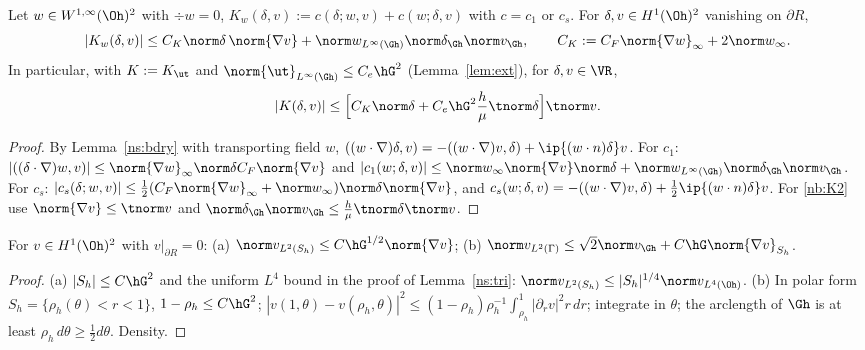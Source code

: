 \begin{lemma}\label{nb:K}
Let $w\in W^{1,\infty}(\Oh)^2$ with $\div w=0$, $K_w(\delta,v):=c(\delta;w,v)+c(w;\delta,v)$ with $c=c_1$ or $c_s$. For $\delta,v\in H^1(\Oh)^2$ vanishing on $\partial R$,
\[
|K_w(\delta,v)|\le C_K\norm\delta\,\norm{\nabla v}+\norm w_{L^\infty(\Gh)}\norm\delta_{\Gh}\norm v_{\Gh},\qquad C_K:=C_F\norm{\nabla w}_\infty+2\norm w_\infty .
\]
In particular, with $K:=K_{\ut}$ and $\norm{\ut}_{L^\infty(\Gh)}\le C_e\hG^2$ (Lemma~\ref{lem:ext}), for $\delta,v\in\VR$,
\begin{equation}\label{nb:K2}
|K(\delta,v)|\le\Bigl[C_K\norm\delta+C_e\hG^2\frac h\mu\tnorm\delta\Bigr]\tnorm v .
\end{equation}
\end{lemma}
\begin{proof}
By Lemma~\ref{ns:bdry} with transporting field $w$, $((w\cdot\nabla)\delta,v)=-((w\cdot\nabla)v,\delta)+\ip{(w\cdot n)\delta}v$. For $c_1$:
$|((\delta\cdot\nabla)w,v)|\le\norm{\nabla w}_\infty\norm\delta C_F\norm{\nabla v}$ and $|c_1(w;\delta,v)|\le\norm w_\infty\norm{\nabla v}\norm\delta+\norm w_{L^\infty(\Gh)}\norm\delta_{\Gh}\norm v_{\Gh}$.
For $c_s$: $|c_s(\delta;w,v)|\le\frac12(C_F\norm{\nabla w}_\infty+\norm w_\infty)\norm\delta\norm{\nabla v}$, and
$c_s(w;\delta,v)=-((w\cdot\nabla)v,\delta)+\frac12\ip{(w\cdot n)\delta}v$. For \eqref{nb:K2} use $\norm{\nabla v}\le\tnorm v$ and $\norm\delta_{\Gh}\norm v_{\Gh}\le\frac h\mu\tnorm\delta\tnorm v$.
\end{proof}

\begin{lemma}\label{nb:strip}
For $v\in H^1(\Oh)^2$ with $v|_{\partial R}=0$: (a) $\norm v_{L^2(S_h)}\le C\hG^{1/2}\norm{\nabla v}$; (b) $\norm v_{L^2(\Gamma)}\le\sqrt2\norm v_{\Gh}+C\hG\norm{\nabla v}_{S_h}$.
\end{lemma}
\begin{proof}
(a) $|S_h|\le C\hG^2$ and the uniform $L^4$ bound in the proof of Lemma~\ref{ns:tri}: $\norm v_{L^2(S_h)}\le|S_h|^{1/4}\norm v_{L^4(\Oh)}$.
(b) In polar form $S_h=\{\rho_h(\theta)<r<1\}$, $1-\rho_h\le C\hG^2$; $|v(1,\theta)-v(\rho_h,\theta)|^2\le(1-\rho_h)\rho_h^{-1}\int_{\rho_h}^1|\partial_rv|^2r\,dr$; integrate in $\theta$; the arclength of $\Gh$ is at least $\rho_h\,d\theta\ge\frac12d\theta$. Density.
\end{proof}

